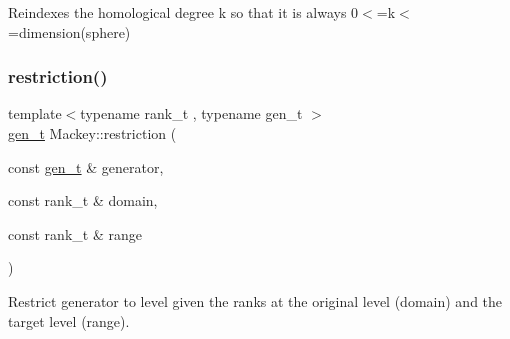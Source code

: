 Reindexes the homological degree k so that it is always 0$<$=k$<$=dimension(sphere) 

\mbox{\label{namespaceMackey_ad1e907ff76b07d4fc4c9d4bdf25918bd}} 
\subsubsection{\texorpdfstring{restriction()}{restriction()}\hspace{0.1cm}{\footnotesize\ttfamily [1/2]}}
{\footnotesize\ttfamily template$<$typename rank\+\_\+t , typename gen\+\_\+t $>$ \\
\hyperlink{namespaceMackey_a6bb0b2796632ba6c7f8ea192f7aecffe}{gen\+\_\+t} Mackey\+::restriction (\begin{DoxyParamCaption}\item[{const \hyperlink{namespaceMackey_a6bb0b2796632ba6c7f8ea192f7aecffe}{gen\+\_\+t} \&}]{generator,  }\item[{const rank\+\_\+t \&}]{domain,  }\item[{const rank\+\_\+t \&}]{range }\end{DoxyParamCaption})}



Restrict generator to level given the ranks at the original level (domain) and the target level (range). 

